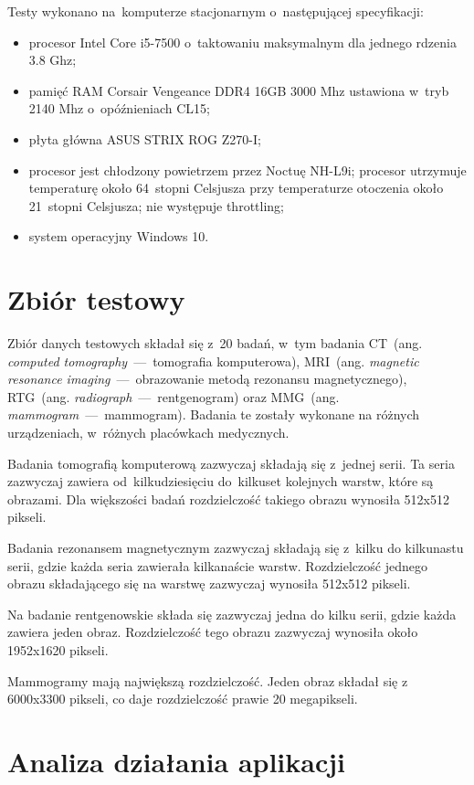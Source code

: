 \documentclass[a4paper,11pt,twoside,openright]{report}
\theoremstyle{definition}
\begin{document}
Testy wykonano na~komputerze stacjonarnym o~następującej specyfikacji:
\begin{itemize}[noitemsep]
\item procesor Intel Core i5-7500 o~taktowaniu maksymalnym dla jednego rdzenia 3.8 Ghz;
\item pamięć RAM Corsair Vengeance DDR4 16GB 3000 Mhz ustawiona w~tryb 2140 Mhz o~opóźnieniach CL15;
\item płyta główna ASUS STRIX ROG Z270-I;
\item procesor jest chłodzony powietrzem przez Noctuę NH-L9i; procesor utrzymuje
temperaturę około 64~stopni Celsjusza przy temperaturze otoczenia około 21~stopni
Celsjusza; nie występuje throttling;
\item system operacyjny Windows 10.
\end{itemize}

\section {Zbiór testowy}

Zbiór danych testowych składał się z~20 badań, w~tym badania
CT~(ang. \textit{computed tomography}~---~tomografia komputerowa),
MRI~(ang. \textit{magnetic resonance imaging}~---~obrazowanie metodą rezonansu magnetycznego),
RTG~(ang. \textit{radiograph}~---~rentgenogram) oraz
MMG~(ang. \textit{mammogram}~---~mammogram).
Badania te zostały wykonane na różnych urządzeniach, w~różnych placówkach medycznych.

Badania tomografią komputerową zazwyczaj składają się z~jednej serii. Ta seria zazwyczaj zawiera od~kilkudziesięciu
do~kilkuset kolejnych warstw, które są obrazami. Dla większości badań rozdzielczość takiego obrazu wynosiła 512x512 pikseli.

Badania rezonansem magnetycznym zazwyczaj składają się z~kilku do kilkunastu serii, gdzie każda seria zawierała kilkanaście warstw.
Rozdzielczość jednego obrazu składającego się na warstwę zazwyczaj wynosiła 512x512 pikseli.

Na badanie rentgenowskie składa się zazwyczaj jedna do kilku serii, gdzie każda zawiera jeden obraz. Rozdzielczość tego obrazu zazwyczaj wynosiła około 1952x1620 pikseli.

Mammogramy mają największą rozdzielczość. Jeden obraz składał się z 6000x3300 pikseli, co daje rozdzielczość prawie 20 megapikseli.

\section {Analiza działania aplikacji}
\end{document}

